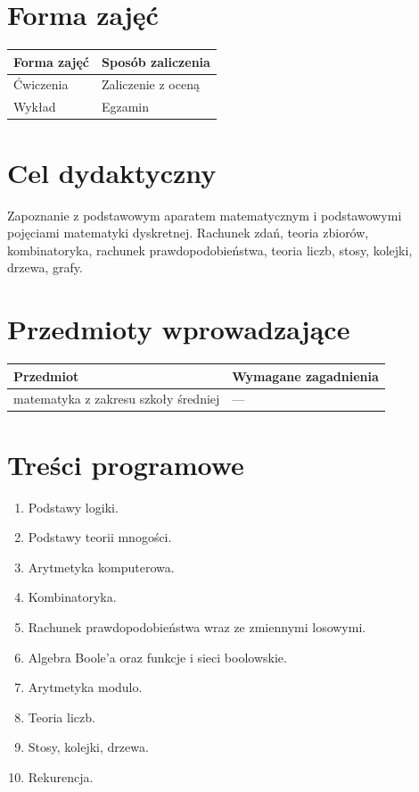\documentclass[12pt, a4paper]{article}
\begin{document}
\section{Forma zajęć}

\begin{tabular}{ll}
  \hline
  \textbf{Forma zajęć} & \textbf{Sposób zaliczenia} \\
  \hline
  Ćwiczenia & Zaliczenie z oceną \\
  Wykład & Egzamin \\
  \hline
\end{tabular}

\section{Cel dydaktyczny}

Zapoznanie z podstawowym aparatem matematycznym i podstawowymi pojęciami matematyki dyskretnej. Rachunek zdań, teoria zbiorów, kombinatoryka, rachunek prawdopodobieństwa, teoria liczb, stosy, kolejki, drzewa, grafy.

\section{Przedmioty wprowadzające}

\begin{tabularx}{\textwidth}{lX}
  \hline
  \textbf{Przedmiot} & \textbf{Wymagane zagadnienia} \\
  \hline
  matematyka z zakresu szkoły średniej & --- \\
  \hline
\end{tabularx}

\section{Treści programowe}

\begin{enumerate}
  \item Podstawy logiki.
  \item Podstawy teorii mnogości.
  \item Arytmetyka komputerowa.
  \item Kombinatoryka.
  \item Rachunek prawdopodobieństwa wraz ze zmiennymi losowymi.
  \item Algebra Boole’a oraz funkcje i sieci boolowskie.
  \item Arytmetyka modulo.
  \item Teoria liczb.
  \item Stosy, kolejki, drzewa.
  \item Rekurencja.
\end{enumerate}
\end{document}

